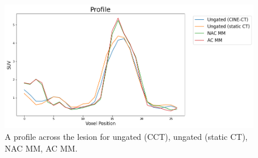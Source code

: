             \begin{figure}
                \centering
                
                \includegraphics[width=1.0\linewidth]{figures/motion_correction_1_results_2_profile.png}
                
                \captionsetup{singlelinecheck=false}
                \caption{
                    A profile across the lesion for ungated (\gls{CCT}), ungated (static \gls{CT}), \gls{NAC} \gls{MM}, \gls{AC} \gls{MM}.
                }
                \label{fig:pet_ct_respiratory_motion_correction_with_a_single_attenuation_map_using_nAC_derived_deformation_fields_results_profile}
            \end{figure}
            
